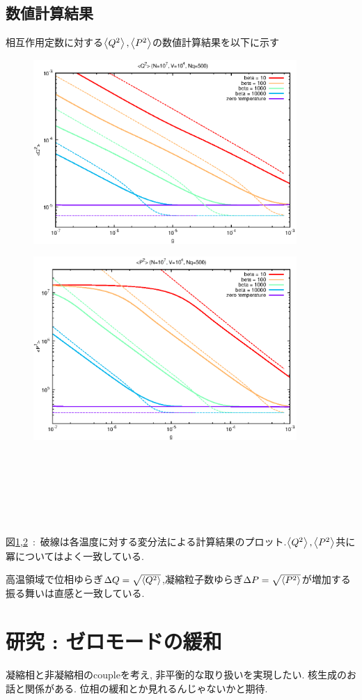 \documentclass[10.5pt,a4paper]{jreport}
\begin{document}
\section{数値計算結果}
相互作用定数に対する$\ev{Q^2},\ev{P^2}$の数値計算結果を以下に示す
\begin{figure}[htbp]
  \centering
  \includegraphics[width = 10cm]{./EPS/Q2.eps}
  \label{Q2}
\end{figure}
\begin{figure}[htbp]
  \centering
  \includegraphics[width = 10cm]{./EPS/P2.eps}
  \label{P2}
\end{figure}
\\\\\\\\\\\\
図\ref{Q2},\ref{P2}\ :\ 破線は各温度に対する変分法による計算結果のプロット.$\ev{Q^2},\ev{P^2}$共に冪についてはよく一致している.

高温領域で位相ゆらぎ$\Delta Q = \sqrt{\ev{Q^2}}$,凝縮粒子数ゆらぎ$\Delta P = \sqrt{\ev{P^2}}$が増加する振る舞いは直感と一致している.
\newpage
\chapter{研究 : ゼロモードの緩和}
凝縮相と非凝縮相のcoupleを考え, 非平衡的な取り扱いを実現したい. 核生成のお話と関係がある. 位相の緩和とか見れるんじゃないかと期待. 
\end{document}
